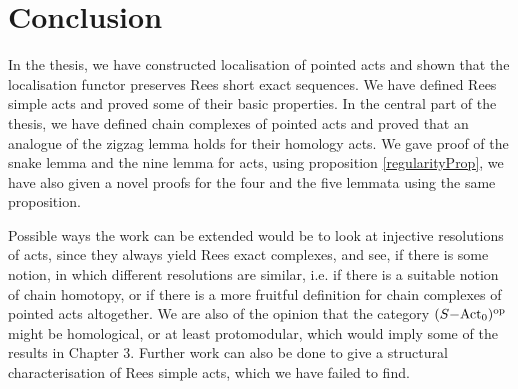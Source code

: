 \chapter*{Conclusion}

    In the thesis, we have constructed localisation of pointed acts and shown that the localisation functor preserves Rees short exact sequences. We 
have defined Rees simple acts and proved some of their basic properties. In the central part of the thesis, we have defined chain complexes of pointed acts and 
proved that an analogue of the zigzag lemma holds for their homology acts. We gave proof of the snake lemma and the nine lemma for acts, using proposition \ref{regularityProp}, we have 
also given a novel proofs for the four and the five lemmata using the same proposition. \par 
    Possible ways the work can be extended would be to look at injective resolutions of acts, since they always yield Rees exact complexes, and see, if there is some notion, in which 
different resolutions are similar, i.e. if there is a suitable notion of chain homotopy, or if there is a more fruitful definition for chain complexes of pointed acts altogether. We are also of the 
opinion that the category $(S\mathrm{-Act}_0)^{\mathrm{op}}$ might be homological, or at least protomodular, which would imply some of the results in Chapter 3. Further work can also be done to give a structural characterisation 
of Rees simple acts, which we have failed to find. 